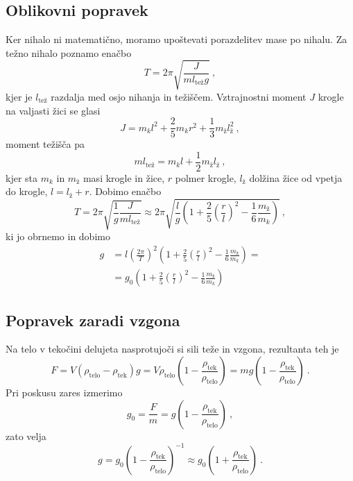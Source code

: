 \documentclass[12pt,a4paper]{article}
\begin{document}
\subsection{Oblikovni popravek}
Ker nihalo ni matematično, moramo upoštevati porazdelitev mase po nihalu. Za težno nihalo poznamo enačbo
$$ T = 2\pi \sqrt{\frac{J}{ml_{\textrm{tež}} g}} \>, $$
kjer je $l_{\textrm{tež}}$ razdalja med osjo nihanja in težiščem. Vztrajnostni moment $J$ krogle na valjasti žici se glasi
$$ J = m_{k} l^{2} + \frac{2}{5} m_{k} r^2 + \frac{1}{3} m_{\textrm{ž}} l_{\textrm{ž}}^{2} \>, $$
moment težišča pa
$$ ml_{\textrm{tež}} = m_{k} l + \frac{1}{2} m_{\textrm{ž}} l_{\textrm{ž}} \>, $$
kjer sta $m_{k}$ in $m_{\textrm{ž}}$ masi krogle in žice, $r$ polmer krogle, $l_{\textrm{ž}}$ dolžina žice od vpetja do krogle, $l = l_{\textrm{ž}} + r$. Dobimo enačbo
$$ T = 2\pi \sqrt{ \frac{1}{g} \frac{J}{ml_{\textrm{tež}}}} \approx 2\pi \sqrt{\frac{l}{g} \left( 1 + \frac{2}{5} \left( \frac{r}{l} \right)^{2} - \frac{1}{6} \frac{m_{\textrm{ž}}}{m_{k}} \right) } \>, $$
ki jo obrnemo in dobimo
\begin{eqnarray*}
  g &= l \left( \frac{2\pi}{T} \right)^2 \left( 1 + \frac{2}{5} \left( \frac{r}{l} \right)^{2} - \frac{1}{6} \frac{m_{\textrm{ž}}}{m_{k}} \right) = \\
  &= g_0 \left( 1 + \frac{2}{5} \left( \frac{r}{l} \right)^{2} - \frac{1}{6} \frac{m_{\textrm{ž}}}{m_{k}} \right)
\end{eqnarray*}

\subsection{Popravek zaradi vzgona}
Na telo v tekočini delujeta nasprotujoči si sili teže in vzgona, rezultanta teh je
$$ F = V \left( \rho_{\textrm{telo}} - \rho_{\textrm{tek}} \right) g = V \rho_{\textrm{telo}} \left( 1 - \frac{\rho_{\textrm{tek}}}{\rho_{\textrm{telo}}} \right) = mg \left( 1 - \frac{\rho_{\textrm{tek}}}{\rho_{\textrm{telo}}} \right) \>. $$
Pri poskusu zares izmerimo
$$ g_{0} = \frac{F}{m} = g \left( 1 - \frac{\rho_{\textrm{tek}}}{\rho_{\textrm{telo}}} \right) \>, $$
zato velja
$$ g = g_{0} \left( 1 - \frac{\rho_{\textrm{tek}}}{\rho_{\textrm{telo}}} \right)^{-1} \approx g_{0} \left( 1 + \frac{\rho_{\textrm{tek}}}{\rho_{\textrm{telo}}} \right) \>. $$
\end{document}
